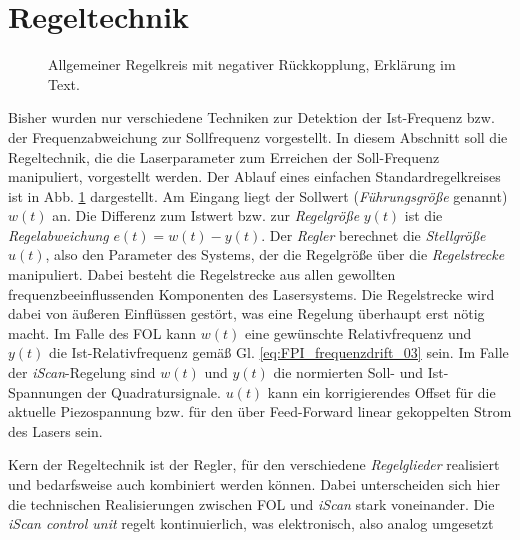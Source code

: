 \section{Regeltechnik}\label{sec:regeltechnik}
\begin{figure}[h]
 	\centering
	\caption[Regelkreis]{Allgemeiner Regelkreis mit negativer
	Rückkopplung, Erklärung im Text.}\label{fig:regelkreis}
\end{figure}
Bisher wurden nur verschiedene Techniken zur Detektion der
Ist-Frequenz bzw. der Frequenzabweichung zur Sollfrequenz vorgestellt.
In diesem Abschnitt soll die Regeltechnik, die die Laserparameter zum Erreichen
der Soll-Frequenz manipuliert, vorgestellt werden. Der Ablauf eines
einfachen Standardregelkreises ist in Abb. \ref{fig:regelkreis} dargestellt. Am
Eingang liegt der Sollwert (\textit{Führungsgröße} genannt) $w(t)$ an. Die
Differenz zum Istwert bzw. zur \textit{Regelgröße} $y(t)$ ist die
\textit{Regelabweichung} $e(t)=w(t)-y(t)$. Der \textit{Regler} berechnet die
\textit{Stellgröße} $u(t)$, also den Parameter des Systems, der die Regelgröße
über die \textit{Regelstrecke} manipuliert. Dabei besteht die Regelstrecke aus
allen gewollten frequenzbeeinflussenden Komponenten des Lasersystems. Die
Regelstrecke wird dabei von äußeren Einflüssen gestört, was eine Regelung
überhaupt erst nötig macht. Im Falle des FOL kann $w(t)$ eine
gewünschte Relativfrequenz und $y(t)$ die Ist-Relativfrequenz gemäß Gl.
\eqref{eq:FPI_frequenzdrift_03} sein. Im Falle der \textit{iScan}-Regelung sind
$w(t)$ und $y(t)$ die normierten Soll- und Ist-Spannungen der Quadratursignale. $u(t)$
kann ein korrigierendes Offset für die aktuelle Piezospannung bzw. für den über
Feed-Forward linear gekoppelten Strom des Lasers sein.\par
Kern der Regeltechnik ist der Regler, für den verschiedene \textit{Regelglieder}
realisiert und bedarfsweise auch kombiniert werden können.
Dabei unterscheiden sich hier die technischen Realisierungen zwischen
FOL und \textit{iScan} stark voneinander. Die \textit{iScan
control unit} regelt kontinuierlich, was elektronisch, also analog umgesetzt
